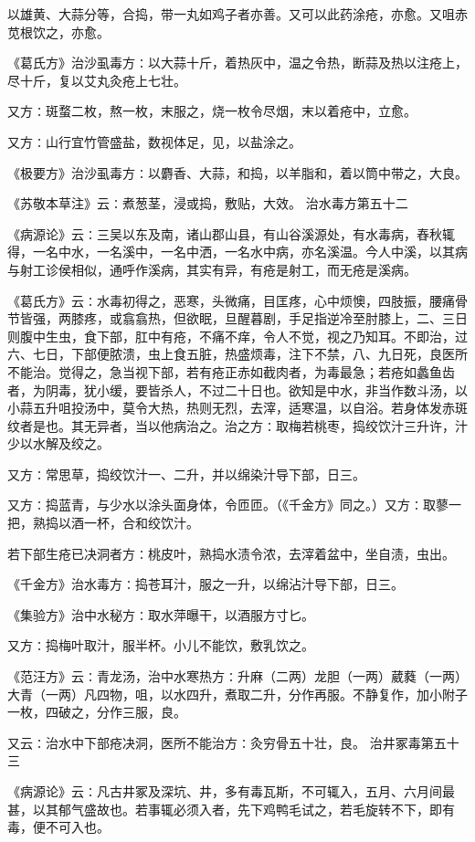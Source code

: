 \documentclass[a4paper,12pt,UTF8,twoside]{ctexbook}
\begin{document}
以雄黄、大蒜分等，合捣，带一丸如鸡子者亦善。又可以此药涂疮，亦愈。又咀赤苋根饮之，亦愈。

《葛氏方》治沙虱毒方∶以大蒜十斤，着热灰中，温之令热，断蒜及热以注疮上，尽十斤，复以艾丸灸疮上七壮。

又方∶斑蝥二枚，熬一枚，末服之，烧一枚令尽烟，末以着疮中，立愈。

又方∶山行宜竹管盛盐，数视体足，见，以盐涂之。

《极要方》治沙虱毒方∶以麝香、大蒜，和捣，以羊脂和，着以筒中带之，大良。

《苏敬本草注》云∶煮葱茎，浸或捣，敷贴，大效。
治水毒方第五十二

《病源论》云∶三吴以东及南，诸山郡山县，有山谷溪源处，有水毒病，舂秋辄得，一名中水，一名溪中，一名中洒，一名水中病，亦名溪温。今人中溪，以其病与射工诊侯相似，通呼作溪病，其实有异，有疮是射工，而无疮是溪病。

《葛氏方》云∶水毒初得之，恶寒，头微痛，目匡疼，心中烦懊，四肢振，腰痛骨节皆强，两膝疼，或翕翕热，但欲眠，旦醒暮剧，手足指逆冷至肘膝上，二、三日则腹中生虫，食下部，肛中有疮，不痛不痒，令人不觉，视之乃知耳。不即治，过六、七日，下部便脓溃，虫上食五脏，热盛烦毒，注下不禁，八、九日死，良医所不能治。觉得之，急当视下部，若有疮正赤如截肉者，为毒最急；若疮如蠡鱼齿者，为阴毒，犹小缓，要皆杀人，不过二十日也。欲知是中水，非当作数斗汤，以小蒜五升咀投汤中，莫令大热，热则无烈，去滓，适寒温，以自浴。若身体发赤斑纹者是也。其无异者，当以他病治之。治之方∶取梅若桃枣，捣绞饮汁三升许，汁少以水解及绞之。

又方∶常思草，捣绞饮汁一、二升，并以绵染汁导下部，日三。

又方∶捣蓝青，与少水以涂头面身体，令匝匝。（《千金方》同之。）又方∶取蓼一把，熟捣以酒一杯，合和绞饮汁。

若下部生疮已决洞者方∶桃皮叶，熟捣水渍令浓，去滓着盆中，坐自渍，虫出。

《千金方》治水毒方∶捣苍耳汁，服之一升，以绵沾汁导下部，日三。

《集验方》治中水秘方∶取水萍曝干，以酒服方寸匕。

又方∶捣梅叶取汁，服半杯。小儿不能饮，敷乳饮之。

《范汪方》云∶青龙汤，治中水寒热方∶升麻（二两）龙胆（一两）葳蕤（一两）大青（一两）凡四物，咀，以水四升，煮取二升，分作再服。不静复作，加小附子一枚，四破之，分作三服，良。

又云∶治水中下部疮决洞，医所不能治方∶灸穷骨五十壮，良。
治井冢毒第五十三

《病源论》云∶凡古井冢及深坑、井，多有毒瓦斯，不可辄入，五月、六月间最甚，以其郁气盛故也。若事辄必须入者，先下鸡鸭毛试之，若毛旋转不下，即有毒，便不可入也。
\end{document}
